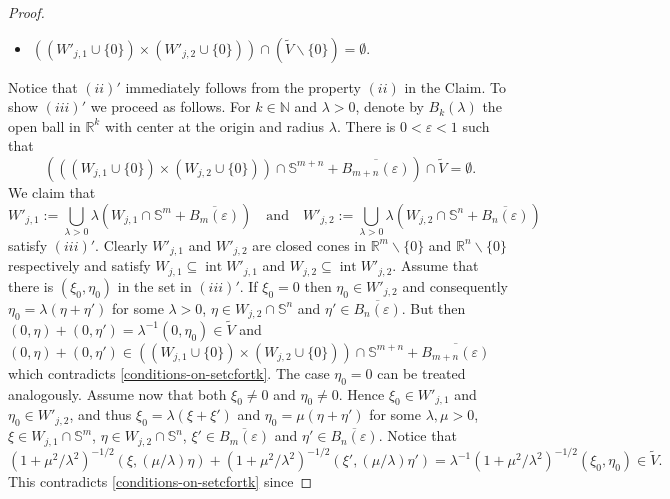\documentclass{amsart}
\theoremstyle{definition}
\begin{document}
\begin{proof}
\begin{itemize}
\item[$(iii)'$] $((W'_{j,1}\cup\{0\})\times(W'_{j,2}\cup\{0\}))\cap(\widetilde{V}\backslash\{0\})=\emptyset$.
\end{itemize}
Notice that $(ii)'$ immediately follows from the property $(ii)$ in the Claim. To show $(iii)'$ we proceed as follows. For $k\in\mathbb{N}$ and $\lambda>0$, denote by $B_k(\lambda)$ the open ball in $\mathbb{R}^k$ with center at the origin and radius $\lambda$. There is $0<\varepsilon<1$ such that
\begin{equation}
\left(((W_{j,1}\cup\{0\})\times(W_{j,2}\cup\{0\}))\cap\mathbb{S}^{m+n}+\overline{B_{m+n}(\varepsilon)}\right)\cap\widetilde{V}=\emptyset.\label{conditions-on-setcfortk}
\end{equation}
We claim that
\begin{equation*}
W'_{j,1}:=\bigcup_{\lambda>0}\lambda\left(W_{j,1}\cap\mathbb{S}^m+\overline{B_m(\varepsilon)}\right)\quad \mbox{and}\quad W'_{j,2}:=\bigcup_{\lambda>0}\lambda\left(W_{j,2}\cap\mathbb{S}^n+\overline{B_n(\varepsilon)}\right)
\end{equation*}
satisfy $(iii)'$. Clearly $W'_{j,1}$ and $W'_{j,2}$ are closed cones in $\mathbb{R}^m\backslash\{0\}$ and $\mathbb{R}^n\backslash\{0\}$ respectively and satisfy $W_{j,1}\subseteq \operatorname{int}W'_{j,1}$ and $W_{j,2}\subseteq \operatorname{int}W'_{j,2}$. Assume that there is $(\xi_0,\eta_0)$ in the set in $(iii)'$. If $\xi_0=0$ then $\eta_0\in W'_{j,2}$ and consequently $\eta_0=\lambda(\eta+\eta')$ for some $\lambda>0$, $\eta\in W_{j,2}\cap\mathbb{S}^n$ and $\eta'\in\overline{B_n(\varepsilon)}$. But then $(0,\eta)+(0,\eta')=\lambda^{-1}(0,\eta_0)\in \widetilde{V}$ and $(0,\eta)+(0,\eta')\in ((W_{j,1}\cup\{0\})\times(W_{j,2}\cup\{0\}))\cap\mathbb{S}^{m+n}+\overline{B_{m+n}(\varepsilon)}$ which contradicts \eqref{conditions-on-setcfortk}. The case $\eta_0=0$ can be treated analogously. Assume now that both $\xi_0\neq0$ and $\eta_0\neq0$. Hence $\xi_0\in W'_{j,1}$ and $\eta_0\in W'_{j,2}$, and thus $\xi_0=\lambda(\xi+\xi')$ and $\eta_0=\mu(\eta+\eta')$ for some $\lambda,\mu>0$, $\xi\in W_{j,1}\cap\mathbb{S}^m$, $\eta\in W_{j,2}\cap\mathbb{S}^n$, $\xi'\in\overline{B_m(\varepsilon)}$ and $\eta'\in\overline{B_n(\varepsilon)}$. Notice that
\begin{equation*}
(1+\mu^2/\lambda^2)^{-1/2}(\xi,(\mu/\lambda)\eta)+(1+\mu^2/\lambda^2)^{-1/2}(\xi',(\mu/\lambda)\eta')=\lambda^{-1}(1+\mu^2/\lambda^2)^{-1/2}(\xi_0,\eta_0)\in\widetilde{V}.
\end{equation*}
This contradicts \eqref{conditions-on-setcfortk} since

\end{proof}
\end{document}
